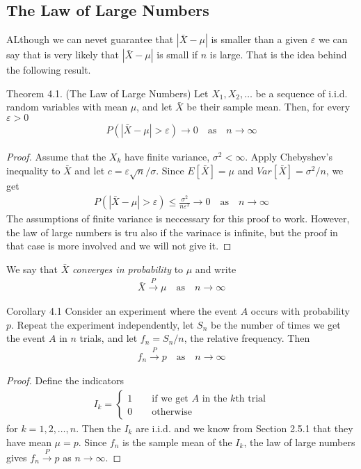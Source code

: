 \subsection{The Law of Large Numbers}
ALthough we can nevet guarantee that $|\bar{X} - \mu|$ is smaller than a given $\varepsilon$ we can say that is very likely that $|\bar{X} - \mu|$ is small if $n$ is large. That is the idea behind the following result.
\begin{boks}{Theorem 4.1. (The Law of Large Numbers)}
  Let $X_1, X_2, \ldots$ be a sequence of i.i.d. random variables with mean $\mu$, and let $\bar{X}$ be their sample mean. Then, for every $\varepsilon > 0$
  \begin{align*}
    P(|\bar{X} - \mu| > \varepsilon) \rightarrow 0 \quad
    \text{as} \quad n \rightarrow \infty
  \end{align*}
\end{boks}
\begin{proof}
  Assume that the $X_k$ have finite variance, $\sigma^2 < \infty$.
  Apply Chebyshev's inequality to $\bar{X}$ and let $c = \varepsilon \sqrt{n}/\sigma$.
  Since $E[\bar{X}] = \mu$ and $Var[\bar{X}] = \sigma^2/n$, we get
  \begin{align*}
    P(|\bar{X} - \mu| > \varepsilon) \leq \frac{\sigma^2}{n\varepsilon^2} \rightarrow 0 \quad
    \text{as} \quad n \rightarrow \infty
  \end{align*}
The assumptions of finite variance is neccessary for this proof to work. However, the law of large numbers is tru also if the varinace is infinite, but the proof in that case is more involved and we will not give it.
\end{proof}
We say that $\bar{X}$ \textit{converges in probability} to $\mu$ and write
\begin{align*}
  \bar{X} \xrightarrow{P} \mu \quad \text{as} \quad n \rightarrow \infty
\end{align*}
\begin{boks}{Corollary 4.1}
  Consider an experiment where the event $A$ occurs with probability $p$. Repeat the experiment independently, let $S_n$ be the number of times we get the event $A$ in $n$ trials, and let $f_n = S_n/n$, the relative frequency. Then
  \begin{align*}
    f_n \xrightarrow{P} p \quad \text{as} \quad n \rightarrow \infty
  \end{align*}
\end{boks}
\begin{proof}
  Define the indicators
  \begin{align*}
    I_k =
    \begin{cases}
      1 \qquad \text{if we get $A$ in the $k$th trial} \\
      0 \qquad \text{otherwise}
    \end{cases}
  \end{align*}
for $k = 1, 2, \ldots, n$. Then the $I_k$ are i.i.d. and we know from Section 2.5.1 that they have mean $\mu = p$. Since $f_n$ is the sample mean of the $I_k$, the law of large numbers gives $f_n \xrightarrow{P} p$ as $n \rightarrow \infty$.
\end{proof}
